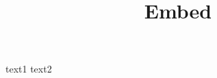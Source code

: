 \documentclass[a4paper,11pt,oneside,openany,report]{jsbook}
\title{Embed}
\begin{document}
\maketitle
text1
text2
\end{document}
